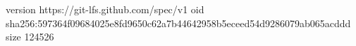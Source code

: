 version https://git-lfs.github.com/spec/v1
oid sha256:597364f09684025e8fd9650c62a7b44642958b5eceed54d9286079ab065acddd
size 124526
